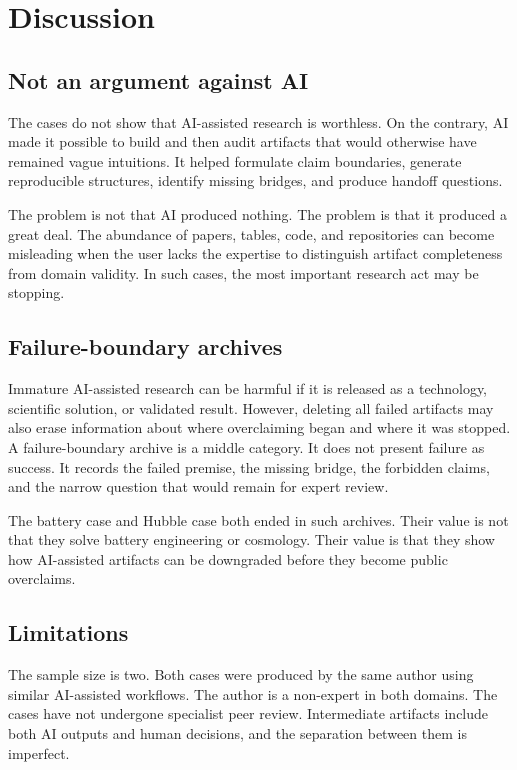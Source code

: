 \documentclass[a4paper,11pt]{article}
\begin{document}
\section{Discussion}

\subsection{Not an argument against AI}

The cases do not show that AI-assisted research is worthless. On the contrary, AI made it possible to build and then audit artifacts that would otherwise have remained vague intuitions. It helped formulate claim boundaries, generate reproducible structures, identify missing bridges, and produce handoff questions.

The problem is not that AI produced nothing. The problem is that it produced a great deal. The abundance of papers, tables, code, and repositories can become misleading when the user lacks the expertise to distinguish artifact completeness from domain validity. In such cases, the most important research act may be stopping.

\subsection{Failure-boundary archives}

Immature AI-assisted research can be harmful if it is released as a technology, scientific solution, or validated result. However, deleting all failed artifacts may also erase information about where overclaiming began and where it was stopped. A failure-boundary archive is a middle category. It does not present failure as success. It records the failed premise, the missing bridge, the forbidden claims, and the narrow question that would remain for expert review.

The battery case and Hubble case both ended in such archives. Their value is not that they solve battery engineering or cosmology. Their value is that they show how AI-assisted artifacts can be downgraded before they become public overclaims.

\subsection{Limitations}

The sample size is two. Both cases were produced by the same author using similar AI-assisted workflows. The author is a non-expert in both domains. The cases have not undergone specialist peer review. Intermediate artifacts include both AI outputs and human decisions, and the separation between them is imperfect.
\end{document}
